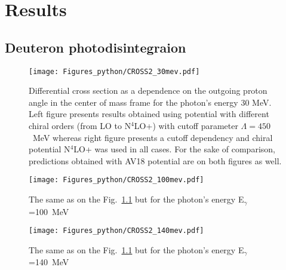 \chapter{Results}

\section{Deuteron photodisintegraion}

    \begin{figure}[h]
        \begin{center}
        \texttt{[image: Figures\_python/CROSS2\_30mev.pdf]}
        \end{center}
        \caption{Differential cross section as a dependence on the outgoing proton angle in the center of mass frame 
        for the photon's energy 30 MeV. Left figure presents results obtained using potential
        with different chiral orders (from LO to N$^4$LO+) with cutoff parameter $\Lambda=450$~MeV
        whereas right figure presents a cutoff dependency and chiral potential N$^4$LO+ was used in all cases.
        For the sake of comparison, predictions obtained with AV18 potential are on both figures as well.}
        \label{CROSS_30}
    \end{figure}
        

    \begin{figure}[h]
        \begin{center}
        \texttt{[image: Figures\_python/CROSS2\_100mev.pdf]}
        \end{center}
        \caption{The same as on the Fig.~\ref{CROSS_30} but for the photon's energy E$_\gamma$=100~MeV}
        \label{CROSS_100}
    \end{figure}

    \begin{figure}[h]
        \begin{center}
        \texttt{[image: Figures\_python/CROSS2\_140mev.pdf]}
        \end{center}
        \caption{The same as on the Fig.~\ref{CROSS_30} but for the photon's energy E$_\gamma$=140~MeV}
        \label{CROSS_140}
    \end{figure}
        